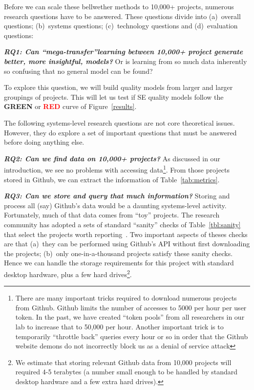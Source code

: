  Before we can scale these bellwether methods to 10,000+ projects, numerous research questions have
to be answered. These questions divide into (a)~overall questions; (b)~systems questions; (c)~technology questions and (d)~evaluation questions: 




\textit{\textbf{ RQ1: Can ``mega-transfer''learning between 10,000+ project generate better, more insightful, models?}}  Or is learning from so much data inherently so confusing that no general model can be found?

To explore this question, we will build
quality models from larger and larger groupings of   projects.
This will let us test if   SE
quality models follow the \textcolor{ao(english)}{{\bf GREEN}} or  \textcolor{red}{{\bf RED}} curve of Figure~\ref{results}.


 
 
 
 

 
 
The following systems-level research questions are not core theoretical
issues. However, they do explore a set of
important questions  that must be answered before doing anything else.


\textit{\textbf{ RQ2: Can we find data on 10,000+ projects?}} As discussed
in our introduction, we see no problems with accessing  data\footnote{There are many
important tricks required to download numerous projects from Github. Github limits the number of accesses to 5000 per hour per user token. In the past, we have created ``token pools'' from all researchers in our lab to increase that to 50,000 per hour.
Another important trick is to temporarily
``throttle back'' queries every hour or so 
in order that the Github website demons do not incorrectly
block us as a denial of service attack}. From those projects stored in Github, we can extract the information
of Table~\ref{tab:metrics}.


\textit{\textbf{ RQ3: Can we store and query that much information?}}
Storing and process all (say) Github's data would be a daunting
systems-level activity.  Fortunately, much of that data comes from   ``toy'' projects. The research community has adopted a sets of standard ``sanity'' checks
of  Table~\ref{tbl:sanity}   that  select the projects worth reporting~\cite{5069475,Kalliamvakou2014,Munaiah2017}.  
Two important aspects of theses checks are that
(a)~they can be performed using Github's API without
first downloading the projects; (b)~only one-in-a-thousand projects satisfy these sanity
checks. Hence we can handle the storage requirements
for this project with standard desktop hardware, plus a few  hard drives\footnote{We estimate that storing relevant Github data from 10,000 projects will required 4-5 terabytes (a number small enough to be handled by standard desktop hardware and a few extra hard drives).}. 


